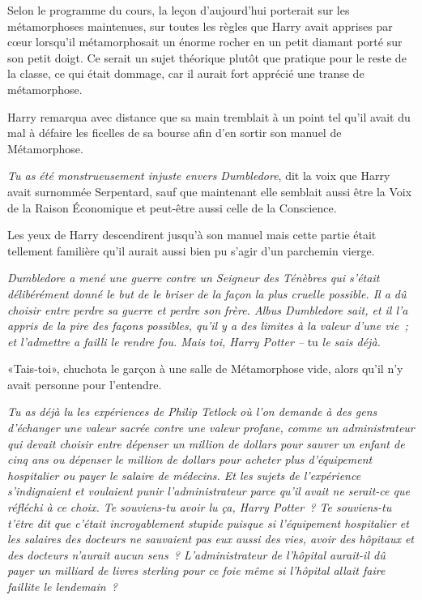 Selon le programme du cours, la leçon d'aujourd'hui porterait sur les métamorphoses maintenues, sur toutes les règles que Harry avait apprises par cœur lorsqu'il métamorphosait un énorme rocher en un petit diamant porté sur son petit doigt. Ce serait un sujet théorique plutôt que pratique pour le reste de la classe, ce qui était dommage, car il aurait fort apprécié une transe de métamorphose.

Harry remarqua avec distance que sa main tremblait à un point tel qu'il avait du mal à défaire les ficelles de sa bourse afin d'en sortir son manuel de Métamorphose.

\emph{Tu as été monstrueusement injuste envers Dumbledore}, dit la voix que Harry avait surnommée Serpentard, sauf que maintenant elle semblait aussi être la Voix de la Raison Économique et peut-être aussi celle de la Conscience.

Les yeux de Harry descendirent jusqu'à son manuel mais cette partie était tellement familière qu'il aurait aussi bien pu s'agir d'un parchemin vierge.

\emph{Dumbledore a mené une guerre contre un Seigneur des Ténèbres qui s'était délibérément donné le but de le briser de la façon la plus cruelle possible. Il a dû choisir entre perdre sa guerre et perdre son frère. Albus Dumbledore sait, et il l'a appris de la pire des façons possibles, qu'il y a des limites à la valeur d'une vie~; et l'admettre a failli le rendre fou. Mais toi, Harry Potter --} tu \emph{le sais déjà.}

«Tais-toi», chuchota le garçon à une salle de Métamorphose vide, alors qu'il n'y avait personne pour l'entendre.

\emph{Tu as déjà lu les expériences de Philip Tetlock où l'on demande à des gens d'échanger une valeur sacrée contre une valeur profane, comme un administrateur qui devait choisir entre dépenser un million de dollars pour sauver un enfant de cinq ans ou dépenser le million de dollars pour acheter plus d'équipement hospitalier ou payer le salaire de médecins. Et les sujets de l'expérience s'indignaient et voulaient punir l'administrateur parce qu'il avait ne serait-ce que réfléchi à ce choix. Te souviens-tu avoir lu ça, Harry Potter~? Te souviens-tu t'être dit que c'était incroyablement stupide puisque si l'équipement hospitalier et les salaires des docteurs ne sauvaient pas eux aussi des vies, avoir des hôpitaux et des docteurs n'aurait aucun sens~? L'administrateur de l'hôpital aurait-il dû payer un milliard de livres sterling pour ce foie même si l'hôpital allait faire faillite le lendemain~?}

